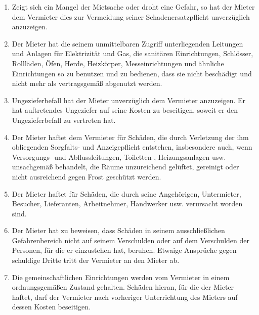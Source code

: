 \documentclass{scrreprt}[12pt,a4paper,twoside,duplex]
\begin{document}
\begin{contract}
\begin{enumerate}
  \item Zeigt sich ein Mangel der Mietsache oder droht eine Gefahr, so hat der
  Mieter dem Vermieter dies zur Vermeidung seiner Schadenersatzpflicht
  unverzüglich anzuzeigen.
  \item Der Mieter hat die seinem unmittelbaren Zugriff unterliegenden Leitungen
  und Anlagen für Elektrizität und Gas, die sanitären Einrichtungen, Schlösser,
  Rollläden, Öfen, Herde, Heizkörper, Messeinrichtungen und ähnliche
  Einrichtungen so zu benutzen und zu bedienen, dass sie nicht beschädigt und
  nicht mehr als vertragsgemäß abgenutzt werden.
  \item Ungezieferbefall hat der Mieter unverzüglich dem Vermieter anzuzeigen.
  Er hat auftretendes Ungeziefer auf seine Kosten zu beseitigen, soweit er den
  Ungezieferbefall zu vertreten hat.
  \item Der Mieter haftet dem Vermieter für Schäden, die durch Verletzung der
  ihm obliegenden Sorgfalts- und Anzeigepflicht entstehen, insbesondere auch,
  wenn Ver\-sor\-gungs- und Abflussleitungen, Toiletten-, Heizungsanlagen usw.
  unsachgemäß behandelt, die Räume unzureichend gelüftet, gereinigt oder nicht
  ausreichend gegen Frost geschützt werden.
  \item Der Mieter haftet für Schäden, die durch seine Angehörigen, Untermieter,
  Besucher, Lieferanten, Arbeitnehmer, Handwerker usw. verursacht worden sind.
  \item Der Mieter hat zu beweisen, dass Schäden in seinem ausschließlichen
  Gefahrenbereich nicht auf seinem Verschulden oder auf dem Verschulden der
  Personen, für die er einzustehen hat, beruhen. Etwaige Ansprüche gegen
  schuldige Dritte tritt der Vermieter an den Mieter ab.
  \item Die gemeinschaftlichen Einrichtungen werden vom Vermieter in einem
  ordnungsgemäßen Zustand gehalten. Schäden hieran, für die der Mieter haftet,
  darf der Vermieter nach vorheriger Unterrichtung des Mieters auf dessen Kosten
  beseitigen.
\end{enumerate}
\end{contract}
\end{document}
